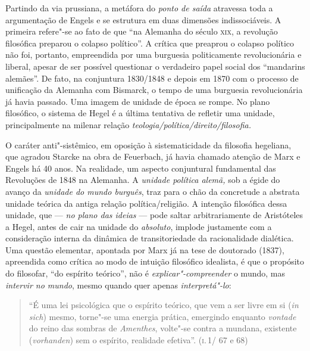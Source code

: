 Partindo da via prussiana, a metáfora do \emph{ponto de saída} atravessa
toda a argumentação de Engels e se estrutura em duas dimensões
indissociáveis. A primeira refere"-se ao fato de que ``na Alemanha do
século \textsc{xix}, a revolução filosófica preparou o colapso político''. A
crítica que preaprou o colapso político não foi, portanto, empreendida
por uma burguesia politicamente revolucionária e liberal, apesar de ser
possível questionar o verdadeiro papel social dos ``mandarins alemães''.
De fato, na conjuntura 1830/1848 e depois em 1870 com o processo de
unificação da Alemanha com Bismarck, o tempo de uma burguesia
revolucionária já havia passado. Uma imagem de unidade de época se
rompe. No plano filosófico, o sistema de Hegel é a última tentativa de
refletir uma unidade, principalmente na milenar relação
\emph{teologia/política/direito/filosofia.}

O caráter anti"-sistêmico, em oposição à sistematicidade da filosofia
hegeliana, que agradou Starcke na obra de Feuerbach, já havia chamado
atenção de Marx e Engels há 40 anos. Na realidade, um aspecto
conjuntural fundamental das Revoluções de 1848 na Alemanha. A
\emph{unidade política alemã,} sob a égide do avanço da \emph{unidade do
mundo burguês}, traz para o chão da concretude a abstrata unidade
teórica da antiga relação política/religião. A intenção filosófica dessa
unidade, que --- \emph{no plano das ideias} --- pode saltar arbitrariamente
de Aristóteles a Hegel, antes de cair na unidade do \emph{absoluto},
implode justamente com a consideração interna da dinâmica de
transitoriedade da racionalidade dialética. Uma questão elementar,
apontada por Marx já na tese de doutorado (1837), apreendida como
crítica ao modo de intuição filosófico idealista, é que o propósito do
filosofar, ``do espírito teórico'', não é \emph{explicar"-compreender} o
mundo, mas \emph{intervir no mundo}, mesmo quando quer apenas
\emph{interpretá"-lo}:

\begin{quote}
``É uma lei psicológica que o espírito teórico, que vem a ser livre em
si (\emph{in sich}) mesmo, torne"-se uma energia prática, emergindo
enquanto \emph{vontade} do reino das sombras de \emph{Amenthes},
volte"-se contra a mundana, existente (\emph{vorhanden}) sem o espírito,
realidade efetiva''. (\textsc{i}.\,1/ 67 e 68)
\end{quote}

